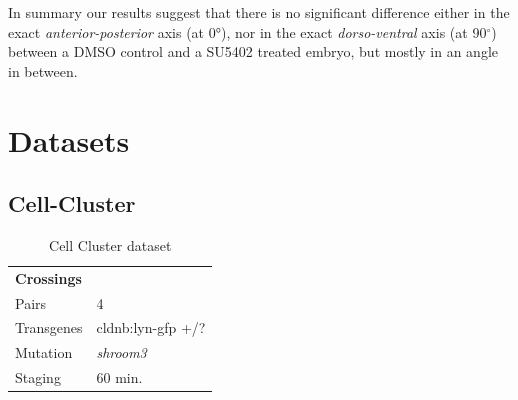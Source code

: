 \documentclass[11pt,singlespacinge,twoside]{reedthesis} %
\begin{document}
In summary our results suggest that there is no significant difference either in the exact \emph{anterior-posterior} axis (at 0°), nor in the exact \emph{dorso-ventral} axis (at 90\(^\circ\)) between a DMSO control and a SU5402 treated embryo, but mostly in an angle in between.

\hypertarget{mat-datasets}{%
\section{Datasets}\label{mat-datasets}}

\hypertarget{cc-data}{%
\subsection{Cell-Cluster}\label{cc-data}}
\begin{longtable}[]{@{}ll@{}}
\caption{\label{tab:ccdata} Cell Cluster dataset}\tabularnewline
\toprule
\endhead
\begin{minipage}[t]{0.21\columnwidth}\raggedright
\textbf{Crossings}\strut
\end{minipage} & \begin{minipage}[t]{0.73\columnwidth}\raggedright
\strut
\end{minipage}\tabularnewline
\begin{minipage}[t]{0.21\columnwidth}\raggedright
Pairs\strut
\end{minipage} & \begin{minipage}[t]{0.73\columnwidth}\raggedright
4\strut
\end{minipage}\tabularnewline
\begin{minipage}[t]{0.21\columnwidth}\raggedright
Transgenes\strut
\end{minipage} & \begin{minipage}[t]{0.73\columnwidth}\raggedright
cldnb:lyn-gfp +/?\strut
\end{minipage}\tabularnewline
\begin{minipage}[t]{0.21\columnwidth}\raggedright
Mutation\strut
\end{minipage} & \begin{minipage}[t]{0.73\columnwidth}\raggedright
\emph{shroom3}\strut
\end{minipage}\tabularnewline
\begin{minipage}[t]{0.21\columnwidth}\raggedright
Staging\strut
\end{minipage} & \begin{minipage}[t]{0.73\columnwidth}\raggedright
60 min.\strut
\end{minipage}\tabularnewline

\end{longtable}
\end{document}
